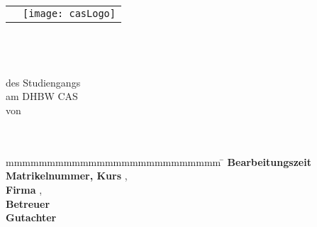 \begin{titlepage}
	\begin{longtable}{p{8.2cm} p{5.4cm}}
		&
		\texttt{[image: casLogo]}
	\end{longtable}
	\enlargethispage{20mm}
	\begin{center}
		\vspace*{12mm}	{\LARGE\textbf \myTitel }\\
		\vspace*{12mm}	{\large\textbf \myArbeit}\\
		\vspace*{3mm}		{\textbf \myDegree}\\
		\vspace*{12mm}	des Studiengangs \myKurs\\
    \vspace*{3mm}		am DHBW CAS\\
		\vspace*{12mm}	von\\
		\vspace*{3mm}		{\large\textbf \myAutor}\\
		\vspace*{12mm}	\myDatum\\
	\end{center}
	\vfill
	\begin{spacing}{1.2}
	\begin{tabbing}
		mmmmmmmmmmmmmmmmmmmmmmmmmm             \= \kill
		\textbf{Bearbeitungszeit}       \>  \myBearbeitungszeit\\
		\textbf{Matrikelnummer, Kurs}  \>  \myMatrikelnr, \myKurs\\
		\textbf{Firma}                  \>  \myFirma, \myFirmenort\\
		\textbf{Betreuer}               \>  \myBetreuer\\
		\textbf{Gutachter}              \>  \myGutachter
	\end{tabbing}
	\end{spacing}
\end{titlepage}